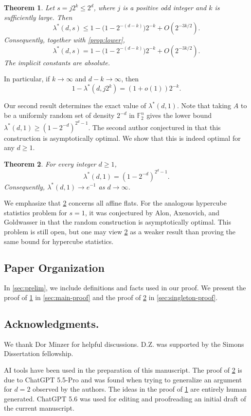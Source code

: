 \documentclass[reqno]{amsart}
\newtheorem{theorem}{Theorem}[section]
\theoremstyle{definition}
\theoremstyle{remark}
\newcommand{\F}{\mathbb F}
\begin{document}
\begin{theorem}\label{thm:main}
Let $s=j2^k\le2^d$, where $j$ is a positive odd integer and $k$ is
sufficiently large.
Then
\[\lambda^*(d,s)\le 1-\bigl(1-2^{-(d-k)}\bigr)2^{-k}+O(2^{-3k/2}).\]
Consequently, together with \cref{prop:lower},
\[\lambda^*(d,s) =1-\bigl(1-2^{-(d-k)}\bigr)2^{-k}+O(2^{-3k/2}).\]
The implicit constants are absolute.
\end{theorem}

In particular, if $k\to\infty$ and $d-k\to\infty$, then
\[
  1-\lambda^*(d,j2^k)=(1+o(1))2^{-k}.
\]


Our second result determines the exact value of $\lambda^*(d,1)$. Note that taking $A$ to be a uniformly random set of density $2^{-d}$ in $\F_2^n$ gives the lower
bound $\lambda^*(d,1)\ge (1-2^{-d})^{2^d-1}$. The second author conjectured in \cite{Xu2026} that this construction is asymptotically optimal. We show that this is indeed optimal for any $d\geq 1$.

\begin{theorem}\label{thm:singleton}
For every integer $d\ge1$,
\[
  \lambda^*(d,1)=(1-2^{-d})^{2^d-1}.
\]
Consequently, $\lambda^*(d,1)\to e^{-1}$ as $d\to\infty$.
\end{theorem}
 
We emphasize that \cref{thm:singleton} concerns
all affine flats. For the analogous hypercube statistics problem for $s = 1$, it was conjectured by Alon, Axenovich, and Goldwasser in \cite{AlonAxenovichGoldwasser2024} that the random construction is asymptotically optimal. This problem is still open, but one may view \cref{thm:singleton} as a weaker result than proving the same bound for hypercube statistics.

\subsection{Paper Organization}
In \cref{sec:prelim}, we include definitions and facts used in our proof.  We present the proof of \cref{thm:main} in \cref{sec:main-proof} and the proof of \cref{thm:singleton} in \cref{sec:singleton-proof}.


\subsection{Acknowledgments.} We thank Dor Minzer for helpful discussions. D.Z. was supported by the Simons Dissertation fellowship.

AI tools have been used in the preparation of this manuscript. The proof of \cref{thm:singleton} is due to ChatGPT 5.5-Pro and was found when trying to generalize an argument for $d=2$ observed by the authors. The ideas in the proof of \cref{thm:main} are entirely human generated. ChatGPT 5.6 was used for editing and proofreading an initial draft of the current manuscript.
\end{document}
